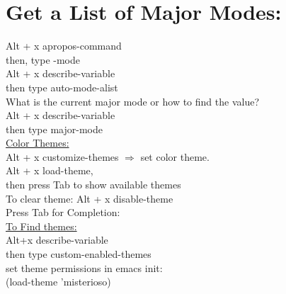 \documentclass{article}
\begin{document}
\section{Get a List of Major Modes:}
Alt + x apropos-command 
\\
then, type -mode
\\
Alt + x describe-variable
\\
then type auto-mode-alist
\\
What is the current major mode or how to find the value?
\\
Alt + x describe-variable
\\
then type major-mode
\\
\underline{Color Themes:}
\\
Alt + x customize-themes $\Rightarrow$ set color theme.
\\
Alt + x load-theme,
\\
then press Tab to show available themes
\\
To clear theme: Alt + x disable-theme
\\
Press Tab for Completion:
\\
\underline{To Find themes:}
\\
Alt+x describe-variable
\\
then type custom-enabled-themes
\\
set theme permissions in emacs init:
\\
(load-theme 'misterioso)
\end{document}

